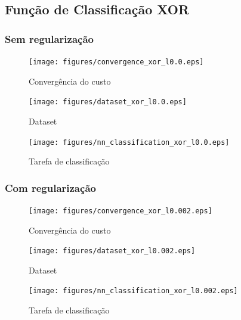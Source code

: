 \documentclass[a4paper,12pt]{article}
\begin{document}
\newpage
\subsection{Função de Classificação XOR}

\subsubsection{Sem regularização}

\begin{figure}[!h]
    \centering
    \begin{minipage}[b]{0.45\linewidth}
        \centering
        \texttt{[image: figures/convergence\_xor\_l0.0.eps]}
        \caption{Convergência do custo}
    \end{minipage}
    \hfill
    \begin{minipage}[b]{0.45\linewidth}
        \centering
        \texttt{[image: figures/dataset\_xor\_l0.0.eps]}
        \caption{Dataset}
    \end{minipage}
    
    \vspace{0.5cm} %
    
    \texttt{[image: figures/nn\_classification\_xor\_l0.0.eps]}
    \caption{Tarefa de classificação}
    
    \label{fig:three_figures}
\end{figure}

\newpage

\subsubsection{Com regularização}

\begin{figure}[!h]
    \centering
    \begin{minipage}[b]{0.45\linewidth}
        \centering
        \texttt{[image: figures/convergence\_xor\_l0.002.eps]}
        \caption{Convergência do custo}
    \end{minipage}
    \hfill
    \begin{minipage}[b]{0.45\linewidth}
        \centering
        \texttt{[image: figures/dataset\_xor\_l0.002.eps]}
        \caption{Dataset}
    \end{minipage}
    
    \vspace{0.5cm} %
    
    \texttt{[image: figures/nn\_classification\_xor\_l0.002.eps]}
    \caption{Tarefa de classificação}
    
    \label{fig:three_figures}
\end{figure}
\end{document}
